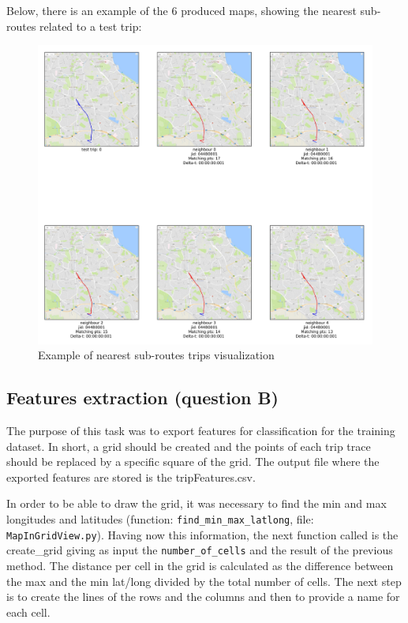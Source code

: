 \documentclass[12pt]{article}
\begin{document}
	Below, there is an example of the 6 produced maps, showing the nearest sub-routes related to a test trip:
	
	\begin{figure} [H]
		\begin{center}
			\includegraphics [scale = 0.50] {question2a2example.jpg}
			\caption{Example of nearest sub-routes trips visualization}
		\end{center}
	\end{figure} 
	
	\subsection{Features extraction (question B)}
	The purpose of this task was to export features for classification for the training dataset. In short, a grid should be created and the points of each trip trace should be replaced by a specific square of the grid. The output file where the exported features are stored is the tripFeatures.csv.
	
	In order to be able to draw the grid, it was necessary to find the min and max longitudes and latitudes (function: \texttt{find\_min\_max\_latlong}, file: \texttt{MapInGridView.py}). Having now this information, the next function called is the create\_grid giving as input the \texttt{number\_of\_cells} and the result of the previous method. The distance per cell in the grid is calculated as the difference between the max and the min lat/long divided by the total number of cells. The next step is to create the lines of the rows and the columns and then to provide a name for each cell.
	
\end{document}
